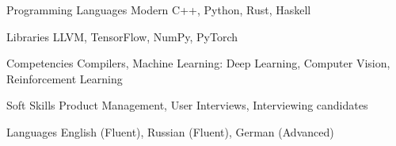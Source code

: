 
\begin{cvskills}

  \cvskill
    {Programming Languages}
    {Modern C++, Python, Rust, Haskell}

  \cvskill
    {Libraries}
    {LLVM, TensorFlow, NumPy, PyTorch}

  \cvskill
    {Competencies}
    {Compilers, Machine Learning: Deep Learning, Computer Vision, Reinforcement
     Learning}

  \cvskill
    {Soft Skills}
    {Product Management, User Interviews, Interviewing candidates}

  \cvskill
    {Languages}
    {English (Fluent), Russian (Fluent), German (Advanced)}

\end{cvskills}

